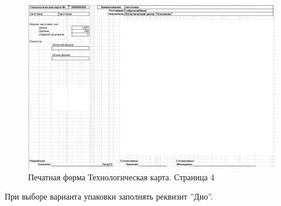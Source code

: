 \begin{figure}
\begin{center}
  \includegraphics[height=0.7\textheight, width=\textwidth, angle=90,
  keepaspectratio]{50_Pics/Tk_4.JPG}
\end{center}
  \caption{Печатная форма Технологическая карта. Страница 4}
  \label{pic:Tk_4}
\end{figure}
\clearpage



При выборе варианта упаковки заполнять реквизит ''Дно''.







